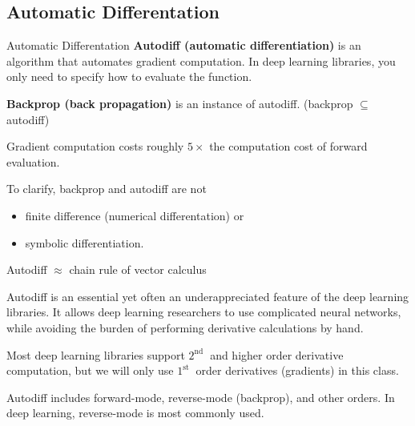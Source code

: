 \subsection{Automatic Differentation}

\begin{frame}[allowframebreaks]

\begin{mydefinitionblock}{6.37}{Automatic Differentation}
    \textbf{Autodiff (automatic differentiation)} is an algorithm that automates gradient computation. In deep learning libraries, you only need to specify how to evaluate the function.

    \textbf{Backprop (back propagation)} is an instance of autodiff. (backprop $\subseteq$ autodiff)

    Gradient computation costs roughly $5 \times$ the computation cost of forward evaluation.

    To clarify, backprop and autodiff are not

    \begin{itemize}
        \item finite difference (numerical differentation) or
        \item symbolic differentiation.
    \end{itemize}

    Autodiff $\approx$ chain rule of vector calculus

    \par\noindent\textcolor{gray}{\hdashrule{\textwidth}{0.4pt}{1pt 2pt}}

    Autodiff is an essential yet often an underappreciated feature of the deep learning libraries. It allows deep learning researchers to use complicated neural networks, while avoiding the burden of performing derivative calculations by hand.

    Most deep learning libraries support $2^{\text {nd }}$ and higher order derivative computation, but we will only use $1^{\text {st }}$ order derivatives (gradients) in this class.

    Autodiff includes forward-mode, reverse-mode (backprop), and other orders. In deep learning, reverse-mode is most commonly used.
\end{mydefinitionblock}

\end{frame}


